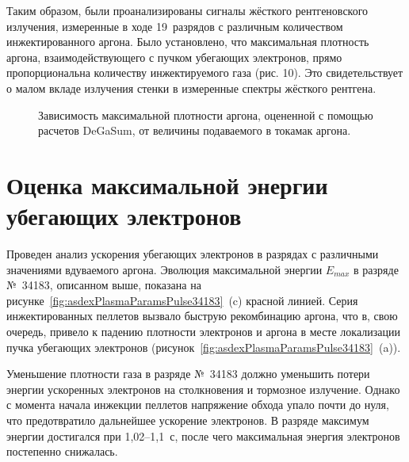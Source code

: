 Таким образом, были проанализированы сигналы жёсткого рентгеновского излучения, измеренные в ходе 19~разрядов с различным количеством инжектированного аргона. Было установлено, что максимальная плотность аргона, взаимодействующего с пучком убегающих электронов, прямо пропорциональна количеству инжектируемого газа (рис. 10). Это свидетельствует о малом вкладе излучения стенки в измеренные спектры жёсткого рентгена.

\begin{figure}[ht!]
  \caption{ Зависимость максимальной плотности аргона, оцененной с помощью расчетов DeGaSum, от величины подаваемого в токамак аргона.~\cite{Shevelev2021} }
  \label{fig:asdexArgonDensityVsHxr}
\end{figure}



\section{Оценка максимальной энергии убегающих электронов}

Проведен анализ ускорения убегающих электронов в разрядах с различными значениями вдуваемого аргона. Эволюция максимальной энергии $E_{max}$ в разряде №~34183, описанном выше, показана на рисунке~\ref{fig:asdexPlasmaParamsPulse34183}~(c) красной линией. Серия инжектированных пеллетов вызвало быструю рекомбинацию аргона, что в, свою очередь, привело к падению плотности электронов и аргона в месте локализации пучка убегающих электронов (рисунок~\ref{fig:asdexPlasmaParamsPulse34183}~(a)).

Уменьшение плотности газа в разряде №~34183 должно уменьшить потери энергии ускоренных электронов на столкновения и тормозное излучение. Однако с момента начала инжекции пеллетов напряжение обхода упало почти до нуля, что предотвратило дальнейшее ускорение электронов. В разряде максимум энергии достигался при 1,02--1,1~с, после чего максимальная энергия электронов постепенно снижалась. 

